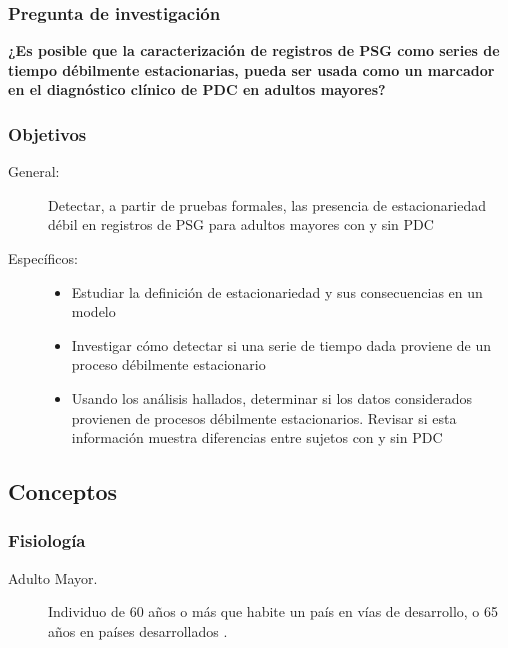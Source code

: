 \documentclass{beamer}
\theoremstyle{definition}
\begin{document}
\begin{frame}\frametitle{Pregunta de investigaci\'on}
\textbf{
¿Es posible que la caracterizaci\'on de registros de PSG como series de tiempo d\'ebilmente 
estacionarias, pueda ser usada como un marcador en el diagn\'ostico cl\'inico de PDC en adultos 
mayores?
}

\end{frame}

\begin{frame}\frametitle{Objetivos}
{\small
\begin{description}
\item[General:]
Detectar, a partir de pruebas formales, las presencia de estacionariedad d\'ebil 
en registros de PSG para adultos mayores con y sin PDC

\item[Espec\'ificos:]
\begin{itemize}
\item Estudiar la definici\'on de estacionariedad y sus consecuencias en un modelo

\item Investigar c\'omo detectar si una serie de tiempo dada proviene de un proceso
d\'ebilmente estacionario

\item Usando los an\'alisis hallados, determinar si los datos considerados provienen de 
procesos débilmente estacionarios.
Revisar si esta informaci\'on muestra diferencias entre sujetos con y sin PDC
\end{itemize}
\end{description}
}
\end{frame}


\subsection{Conceptos}


\subsubsection{Fisiolog\'ia}

\begin{frame}
\begin{description}
\item[Adulto Mayor.] Individuo de 60 a\~nos o m\'as que habite un pa\'is en v\'ias de desarrollo, o 
65 a\~nos en pa\'ises desarrollados \cite{Hita14}.
\end{description}
\end{frame}
\end{document}
